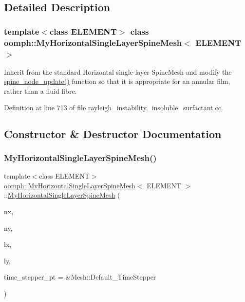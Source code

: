 \subsection{Detailed Description}
\subsubsection*{template$<$class E\+L\+E\+M\+E\+NT$>$\newline
class oomph\+::\+My\+Horizontal\+Single\+Layer\+Spine\+Mesh$<$ E\+L\+E\+M\+E\+N\+T $>$}

Inherit from the standard Horizontal single-\/layer Spine\+Mesh and modify the \hyperlink{classoomph_1_1MyHorizontalSingleLayerSpineMesh_ad007f1c20530cda9a495d89a4470772c}{spine\+\_\+node\+\_\+update()} function so that it is appropriate for an annular film, rather than a fluid fibre. 

Definition at line 713 of file rayleigh\+\_\+instability\+\_\+insoluble\+\_\+surfactant.\+cc.



\subsection{Constructor \& Destructor Documentation}
\mbox{\label{classoomph_1_1MyHorizontalSingleLayerSpineMesh_a0bd73ed947e30341144d081df52332b5}} 
\subsubsection{\texorpdfstring{My\+Horizontal\+Single\+Layer\+Spine\+Mesh()}{MyHorizontalSingleLayerSpineMesh()}}
{\footnotesize\ttfamily template$<$class E\+L\+E\+M\+E\+NT$>$ \\
\hyperlink{classoomph_1_1MyHorizontalSingleLayerSpineMesh}{oomph\+::\+My\+Horizontal\+Single\+Layer\+Spine\+Mesh}$<$ E\+L\+E\+M\+E\+NT $>$\+::\hyperlink{classoomph_1_1MyHorizontalSingleLayerSpineMesh}{My\+Horizontal\+Single\+Layer\+Spine\+Mesh} (\begin{DoxyParamCaption}\item[{const unsigned \&}]{nx,  }\item[{const unsigned \&}]{ny,  }\item[{const double \&}]{lx,  }\item[{const double \&}]{ly,  }\item[{Time\+Stepper $\ast$}]{time\+\_\+stepper\+\_\+pt = {\ttfamily \&Mesh\+:\+:Default\+\_\+TimeStepper} }\end{DoxyParamCaption})\hspace{0.3cm}{\ttfamily [inline]}}



